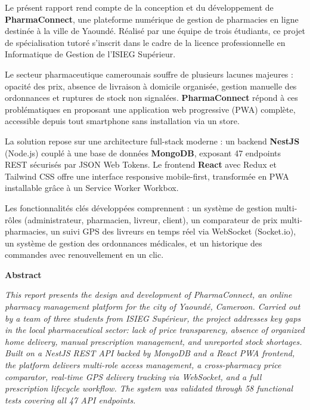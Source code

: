 \documentclass[12pt,a4paper,oneside]{report}
\newcommand{\pharma}{\textcolor{vertpharma}{\textbf{PharmaConnect}}}
\begin{document}
Le présent rapport rend compte de la conception et du développement de \textbf{PharmaConnect}, une plateforme numérique de gestion de pharmacies en ligne destinée à la ville de Yaoundé. Réalisé par une équipe de trois étudiants, ce projet de spécialisation tutoré s'inscrit dans le cadre de la licence professionnelle en Informatique de Gestion de l'ISIEG Supérieur.

Le secteur pharmaceutique camerounais souffre de plusieurs lacunes majeures : opacité des prix, absence de livraison à domicile organisée, gestion manuelle des ordonnances et ruptures de stock non signalées. \pharma{} répond à ces problématiques en proposant une application web progressive (PWA) complète, accessible depuis tout smartphone sans installation via un store.

La solution repose sur une architecture full-stack moderne : un backend \textbf{NestJS} (Node.js) couplé à une base de données \textbf{MongoDB}, exposant 47 endpoints REST sécurisés par JSON Web Tokens. Le frontend \textbf{React} avec Redux et Tailwind CSS offre une interface responsive mobile-first, transformée en PWA installable grâce à un Service Worker Workbox.

Les fonctionnalités clés développées comprennent : un système de gestion multi-rôles (administrateur, pharmacien, livreur, client), un comparateur de prix multi-pharmacies, un suivi GPS des livreurs en temps réel via WebSocket (Socket.io), un système de gestion des ordonnances médicales, et un historique des commandes avec renouvellement en un clic.

\vspace{0.6cm}
\textbf{Abstract}

\vspace{0.3cm}
\textit{This report presents the design and development of PharmaConnect, an online pharmacy management platform for the city of Yaoundé, Cameroon. Carried out by a team of three students from ISIEG Supérieur, the project addresses key gaps in the local pharmaceutical sector: lack of price transparency, absence of organized home delivery, manual prescription management, and unreported stock shortages. Built on a NestJS REST API backed by MongoDB and a React PWA frontend, the platform delivers multi-role access management, a cross-pharmacy price comparator, real-time GPS delivery tracking via WebSocket, and a full prescription lifecycle workflow. The system was validated through 58 functional tests covering all 47 API endpoints.}

\clearpage
\end{document}
